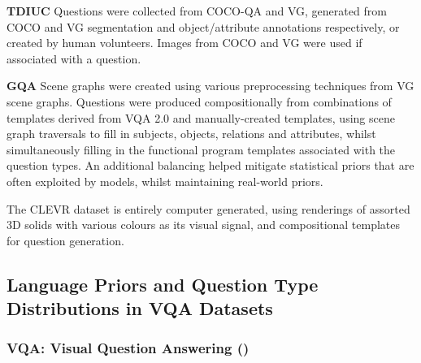\textbf{TDIUC} \cite{kafle2017analysis} Questions were collected from COCO-QA and VG, generated from COCO and VG segmentation and object/attribute annotations respectively, or created by human volunteers. Images from COCO and VG were used if associated with a question.

\textbf{GQA} \cite{hudson2019gqa} Scene graphs were created using various preprocessing techniques from VG scene graphs. Questions were produced compositionally from combinations of templates derived from VQA 2.0 and manually-created templates, using scene graph traversals to fill in subjects, objects, relations and attributes, whilst simultaneously filling in the functional program templates associated with the question types. An additional balancing helped mitigate statistical priors that are often exploited by models, whilst maintaining real-world priors.


The CLEVR dataset \cite{johnson2017clevr} is entirely computer generated, using renderings of assorted 3D solids with various colours as its visual signal, and compositional templates for question generation.




\subsection{Language Priors and Question Type Distributions in VQA Datasets}
\label{subsec:lanauge_priors_in_vqa_datasets}

\subsubsection*{VQA: Visual Question Answering (\cite{antol2015vqa})}

